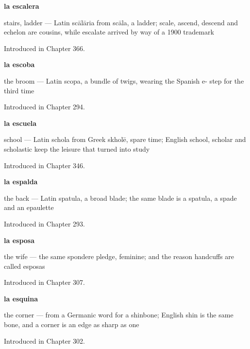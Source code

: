 \noindent\begin{minipage}[t]{\linewidth}
\raggedright
\textbf{la escalera}\par
\small stairs, ladder — Latin scālāria from scāla, a ladder; scale, ascend, descend and echelon are cousins, while escalate arrived by way of a 1900 trademark\par
\footnotesize Introduced in Chapter 366.
\end{minipage}\par\medskip

\noindent\begin{minipage}[t]{\linewidth}
\raggedright
\textbf{la escoba}\par
\small the broom — Latin scopa, a bundle of twigs, wearing the Spanish e- step for the third time\par
\footnotesize Introduced in Chapter 294.
\end{minipage}\par\medskip

\noindent\begin{minipage}[t]{\linewidth}
\raggedright
\textbf{la escuela}\par
\small school — Latin schola from Greek skholē, spare time; English school, scholar and scholastic keep the leisure that turned into study\par
\footnotesize Introduced in Chapter 346.
\end{minipage}\par\medskip

\noindent\begin{minipage}[t]{\linewidth}
\raggedright
\textbf{la espalda}\par
\small the back — Latin spatula, a broad blade; the same blade is a spatula, a spade and an epaulette\par
\footnotesize Introduced in Chapter 293.
\end{minipage}\par\medskip

\noindent\begin{minipage}[t]{\linewidth}
\raggedright
\textbf{la esposa}\par
\small the wife --- the same spondere pledge, feminine; and the reason handcuffs are called esposas\par
\footnotesize Introduced in Chapter 307.
\end{minipage}\par\medskip

\noindent\begin{minipage}[t]{\linewidth}
\raggedright
\textbf{la esquina}\par
\small the corner — from a Germanic word for a shinbone; English shin is the same bone, and a corner is an edge as sharp as one\par
\footnotesize Introduced in Chapter 302.
\end{minipage}\par\medskip

